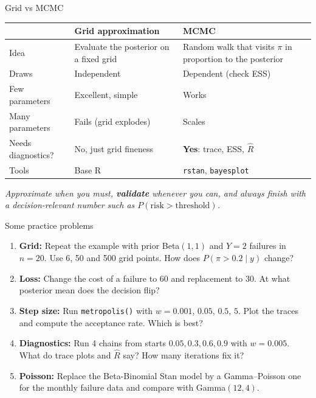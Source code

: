 \documentclass[aspectratio=43,11pt]{beamer}
\begin{document}
\begin{frame}{Grid vs MCMC}
  \centering
  \footnotesize
  \begin{tabular}{L{2.6cm}L{3.6cm}L{3.6cm}}
    \toprule
     & \textbf{Grid approximation} & \textbf{MCMC}\\
    \midrule
    Idea & Evaluate the posterior on a fixed grid & Random walk that visits $\pi$ in proportion to the posterior\\ \hline
    Draws & Independent & Dependent (check ESS)\\ \hline
    Few parameters & Excellent, simple & Works\\ \hline
    Many parameters & Fails (grid explodes) & Scales\\ \hline
    Needs diagnostics? & No, just grid fineness & \textbf{Yes}: trace, ESS, $\hat R$\\ \hline
    Tools & Base R & \texttt{rstan}, \texttt{bayesplot}\\
    \bottomrule
  \end{tabular}
  \begin{block}{}
    {\it Approximate when you must, \textbf{validate} whenever you can, and always finish with a
    decision-relevant number such as $P(\text{risk}>\text{threshold})$.}
  \end{block}
\end{frame}

\begin{frame}{Some practice problems}
  \small
  \begin{enumerate}
    \item \textbf{Grid:} Repeat the example with prior Beta$(1,1)$ and $Y=2$ failures in $n=20$.
      Use 6, 50 and 500 grid points. How does $P(\pi>0.2\mid y)$ change?
    \item \textbf{Loss:} Change the cost of a failure to 60 and replacement to 30.
      At what posterior mean does the decision flip?
    \item \textbf{Step size:} Run \texttt{metropolis()} with $w=0.001$, $0.05$, $0.5$, $5$.
      Plot the traces and compute the acceptance rate. Which is best?
    \item \textbf{Diagnostics:} Run 4 chains from starts $0.05,0.3,0.6,0.9$ with $w=0.005$.
      What do trace plots and $\hat R$ say? How many iterations fix it?
    \item \textbf{Poisson:} Replace the Beta-Binomial Stan model by a Gamma--Poisson one
      for the monthly failure data and compare with Gamma$(12,4)$.
  \end{enumerate}
\end{frame}
\end{document}
